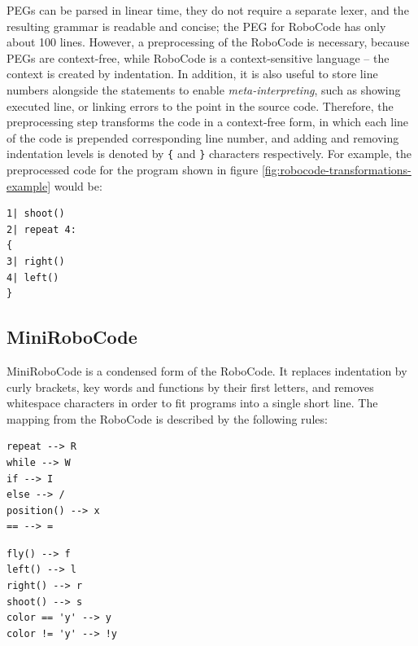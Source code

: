 PEGs can be parsed in linear time, they do not require a separate lexer,
and the resulting grammar is readable and concise;
the PEG for RoboCode %
has only about 100 lines. %
However, a preprocessing of the RoboCode is necessary, because
PEGs are context-free,
while RoboCode is a context-sensitive language
-- the context is created by indentation.
In addition, it is also useful to store line numbers alongside the statements
to enable \emph{meta-interpreting},
such as showing executed line, or linking errors to the point in the source code.
Therefore, the preprocessing step transforms the code in a context-free form,
in which each line of the code is prepended corresponding line number,
and adding and removing indentation levels is denoted by \texttt{\{}
and \texttt{\}} characters respectively.
For example, the preprocessed code for the program shown in figure
\ref{fig:robocode-transformations-example} would be:
\begin{lstlisting}
1| shoot()
2| repeat 4:
{
3| right()
4| left()
}
\end{lstlisting}

\subsection{MiniRoboCode}
\label{sec:minirobocode}

MiniRoboCode is a condensed form of the RoboCode.
It replaces indentation by curly brackets,
key words and functions by their first letters,
and removes whitespace characters
in order to fit programs into a single short line.
The mapping from the RoboCode is described by the following rules:
\smallskip

\noindent\begin{minipage}{.49\textwidth}
\begin{lstlisting}[numbers=none]
repeat --> R
while --> W
if --> I
else --> /
position() --> x
== --> =
\end{lstlisting}
\end{minipage}\hfill
\begin{minipage}{.49\textwidth}
\begin{lstlisting}[numbers=none]
fly() --> f
left() --> l
right() --> r
shoot() --> s
color == 'y' --> y
color != 'y' --> !y
\end{lstlisting}
\end{minipage}

